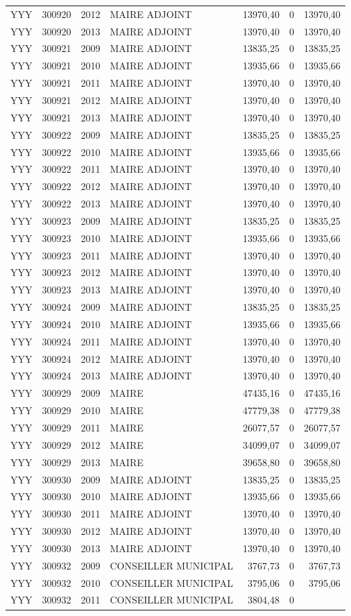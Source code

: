 \begin{longtable}[]{@{}llrlrrr@{}}
YYY & 300920 & 2012 & MAIRE ADJOINT & 13970,40 & 0 &
13970,40\tabularnewline
YYY & 300920 & 2013 & MAIRE ADJOINT & 13970,40 & 0 &
13970,40\tabularnewline
YYY & 300921 & 2009 & MAIRE ADJOINT & 13835,25 & 0 &
13835,25\tabularnewline
YYY & 300921 & 2010 & MAIRE ADJOINT & 13935,66 & 0 &
13935,66\tabularnewline
YYY & 300921 & 2011 & MAIRE ADJOINT & 13970,40 & 0 &
13970,40\tabularnewline
YYY & 300921 & 2012 & MAIRE ADJOINT & 13970,40 & 0 &
13970,40\tabularnewline
YYY & 300921 & 2013 & MAIRE ADJOINT & 13970,40 & 0 &
13970,40\tabularnewline
YYY & 300922 & 2009 & MAIRE ADJOINT & 13835,25 & 0 &
13835,25\tabularnewline
YYY & 300922 & 2010 & MAIRE ADJOINT & 13935,66 & 0 &
13935,66\tabularnewline
YYY & 300922 & 2011 & MAIRE ADJOINT & 13970,40 & 0 &
13970,40\tabularnewline
YYY & 300922 & 2012 & MAIRE ADJOINT & 13970,40 & 0 &
13970,40\tabularnewline
YYY & 300922 & 2013 & MAIRE ADJOINT & 13970,40 & 0 &
13970,40\tabularnewline
YYY & 300923 & 2009 & MAIRE ADJOINT & 13835,25 & 0 &
13835,25\tabularnewline
YYY & 300923 & 2010 & MAIRE ADJOINT & 13935,66 & 0 &
13935,66\tabularnewline
YYY & 300923 & 2011 & MAIRE ADJOINT & 13970,40 & 0 &
13970,40\tabularnewline
YYY & 300923 & 2012 & MAIRE ADJOINT & 13970,40 & 0 &
13970,40\tabularnewline
YYY & 300923 & 2013 & MAIRE ADJOINT & 13970,40 & 0 &
13970,40\tabularnewline
YYY & 300924 & 2009 & MAIRE ADJOINT & 13835,25 & 0 &
13835,25\tabularnewline
YYY & 300924 & 2010 & MAIRE ADJOINT & 13935,66 & 0 &
13935,66\tabularnewline
YYY & 300924 & 2011 & MAIRE ADJOINT & 13970,40 & 0 &
13970,40\tabularnewline
YYY & 300924 & 2012 & MAIRE ADJOINT & 13970,40 & 0 &
13970,40\tabularnewline
YYY & 300924 & 2013 & MAIRE ADJOINT & 13970,40 & 0 &
13970,40\tabularnewline
YYY & 300929 & 2009 & MAIRE & 47435,16 & 0 & 47435,16\tabularnewline
YYY & 300929 & 2010 & MAIRE & 47779,38 & 0 & 47779,38\tabularnewline
YYY & 300929 & 2011 & MAIRE & 26077,57 & 0 & 26077,57\tabularnewline
YYY & 300929 & 2012 & MAIRE & 34099,07 & 0 & 34099,07\tabularnewline
YYY & 300929 & 2013 & MAIRE & 39658,80 & 0 & 39658,80\tabularnewline
YYY & 300930 & 2009 & MAIRE ADJOINT & 13835,25 & 0 &
13835,25\tabularnewline
YYY & 300930 & 2010 & MAIRE ADJOINT & 13935,66 & 0 &
13935,66\tabularnewline
YYY & 300930 & 2011 & MAIRE ADJOINT & 13970,40 & 0 &
13970,40\tabularnewline
YYY & 300930 & 2012 & MAIRE ADJOINT & 13970,40 & 0 &
13970,40\tabularnewline
YYY & 300930 & 2013 & MAIRE ADJOINT & 13970,40 & 0 &
13970,40\tabularnewline
YYY & 300932 & 2009 & CONSEILLER MUNICIPAL & 3767,73 & 0 &
3767,73\tabularnewline
YYY & 300932 & 2010 & CONSEILLER MUNICIPAL & 3795,06 & 0 &
3795,06\tabularnewline
YYY & 300932 & 2011 & CONSEILLER MUNICIPAL & 3804,48 & 0 &

\end{longtable}

